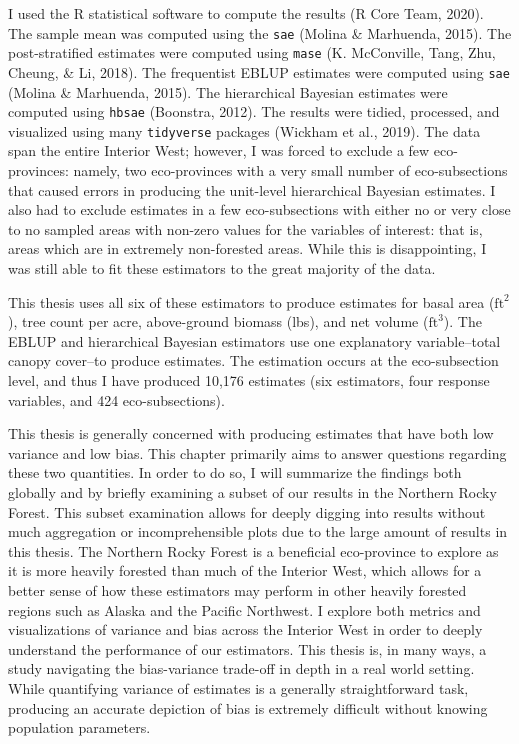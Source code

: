 \documentclass[12pt,twoside]{reedthesis}
\begin{document}
I used the R statistical software to compute the results (R Core Team, 2020). The sample mean was computed using the \texttt{sae} (Molina \& Marhuenda, 2015). The post-stratified estimates were computed using \texttt{mase} (K. McConville, Tang, Zhu, Cheung, \& Li, 2018). The frequentist EBLUP estimates were computed using \texttt{sae} (Molina \& Marhuenda, 2015). The hierarchical Bayesian estimates were computed using \texttt{hbsae} (Boonstra, 2012). The results were tidied, processed, and visualized using many \texttt{tidyverse} packages (Wickham et al., 2019). The data span the entire Interior West; however, I was forced to exclude a few eco-provinces: namely, two eco-provinces with a very small number of eco-subsections that caused errors in producing the unit-level hierarchical Bayesian estimates. I also had to exclude estimates in a few eco-subsections with either no or very close to no sampled areas with non-zero values for the variables of interest: that is, areas which are in extremely non-forested areas. While this is disappointing, I was still able to fit these estimators to the great majority of the data.

This thesis uses all six of these estimators to produce estimates for basal area (\(\text{ft}^2\)), tree count per acre, above-ground biomass (lbs), and net volume (\(\text{ft}^3\)). The EBLUP and hierarchical Bayesian estimators use one explanatory variable--total canopy cover--to produce estimates. The estimation occurs at the eco-subsection level, and thus I have produced 10,176 estimates (six estimators, four response variables, and 424 eco-subsections).

This thesis is generally concerned with producing estimates that have both low variance and low bias. This chapter primarily aims to answer questions regarding these two quantities. In order to do so, I will summarize the findings both globally and by briefly examining a subset of our results in the Northern Rocky Forest. This subset examination allows for deeply digging into results without much aggregation or incomprehensible plots due to the large amount of results in this thesis. The Northern Rocky Forest is a beneficial eco-province to explore as it is more heavily forested than much of the Interior West, which allows for a better sense of how these estimators may perform in other heavily forested regions such as Alaska and the Pacific Northwest. I explore both metrics and visualizations of variance and bias across the Interior West in order to deeply understand the performance of our estimators. This thesis is, in many ways, a study navigating the bias-variance trade-off in depth in a real world setting. While quantifying variance of estimates is a generally straightforward task, producing an accurate depiction of bias is extremely difficult without knowing population parameters.
\end{document}
